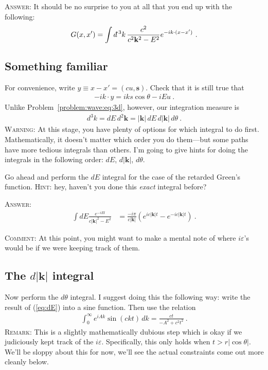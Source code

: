 \documentclass[12pt]{article}
\numberwithin{equation}{section}    %
\renewcommand{\vec}[1]{\mathbf{#1}} %
\newcommand{\dbar}{d\mkern-6mu\mathchar'26}    %
\begin{document}
\textsc{Answer:} It should be no surprise to you at all that you end up with the following:
\begin{align}
	G(x,x') = \int \dbar^3k \, \frac{c^2}{c^2 \vec k^2 - E^2} e^{-ik\cdot (x-x')} \ .
	\label{eq:G:ft}
\end{align} 


\subsection{Something familiar}

For convenience, write $y \equiv x-x' = (cu,\mathbf{s})$. Check that it is still true that
\begin{align}
	-ik\cdot y = i k s \cos \theta  - i E u \ .
\end{align}
Unlike Problem~\ref{problem:wave:eq:3d}, however, our integration measure is
\begin{align}
	d^3 k = dE \, d^2\vec k = |\vec k| \,dE \,  d|\vec k| \, d \theta  \ .
\end{align}
\textsc{Warning:} At this stage, you have plenty of options for which integral to do first. Mathematically, it doesn't matter which order you do them---but some paths have more tedious integrals than others. I'm going to give hints for doing the integrals in the following order: $dE$, $d|\vec k|$, $d\theta$. 


Go ahead and perform the $dE$ integral for the case of the retarded Green's function. \textsc{Hint}: hey, haven't you done this \emph{exact} integral before? 

\textsc{Answer}:
\begin{align}
\int dE \frac{e^{-iEt}}{c|\vec k|^2 -E^2}
&=
\frac{-i\pi}{c|\vec k|} 
\left(
e^{ic|\vec k| t}
-
e^{-ic|\vec k| t}
\right) \ .
\label{eq:dE}
\end{align}

\textsc{Comment}: At this point, you might want to make a mental note of where $i\varepsilon$'s would be if we were keeping track of them.

\subsection{The $d|\vec k|$ integral}

Now perform the $d\theta$ integral. I suggest doing this the following way: write the result of (\ref{eq:dE}) into a sine function. Then use the relation
\begin{align}
	\int_0^\infty e^{iAk}\sin(ckt)\, dk = \frac{ct}{-A^2 + c^2t^2} \ .
\end{align}
\textsc{Remark:} This is a slightly mathematically dubious step which is okay if we judiciously kept track of the $i\varepsilon$. Specifically, this only holds when $t > r|\cos\theta|$. We'll be sloppy about this for now, we'll see the actual constraints come out more cleanly below.
\end{document}

